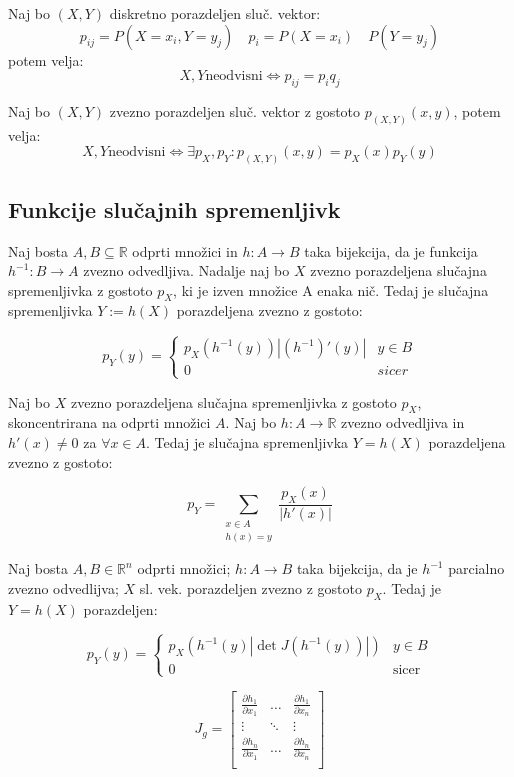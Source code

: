 \begin{multicols}{5}
Naj bo $(X, Y)$ diskretno porazdeljen sluč. vektor:
\[ p_{ij} = P(X = x_i, Y = y_j) \quad p_i = P(X = x_i) \quad P(Y = y_j) \]
potem velja:
\[ X, Y \text{neodvisni} \iff p_{ij} = p_i q_j \]


Naj bo $(X, Y)$ zvezno porazdeljen sluč. vektor z gostoto $ p_{(X, Y)}(x,y)$, potem velja:
\[ X, Y \text{neodvisni} \iff \exists p_X, p_Y: p_{(X,Y)}(x,y) = p_X(x) p_Y(y)\]

\subsection{Funkcije slučajnih spremenljivk}
Naj bosta $A, B \subseteq \mathbb{R}$ odprti množici in $h: A \to B$ taka bijekcija, da je funkcija
$h^{-1}: B \to A$ zvezno odvedljiva. Nadalje naj bo $X$ zvezno porazdeljena slučajna
spremenljivka z gostoto $p_X$, ki je izven množice A enaka nič. Tedaj je slučajna
spremenljivka $Y := h(X)$ porazdeljena zvezno z gostoto:

\[ p_Y(y) = \begin{cases}
	p_X\left( h^{-1}(y) \right) \left|(h^{-1})'(y)\right| & y \in B \\
	0 & sicer	
\end{cases}\]

Naj bo $X$ zvezno porazdeljena slučajna spremenljivka z gostoto $p_X$, skoncentrirana na odprti množici $A$. Naj bo $h: A \to \mathbb{R}$ zvezno odvedljiva in $h'(x) \neq 0$ za $\forall x \in A$. 
Tedaj je slučajna spremenljivka $Y = h(X)$ porazdeljena zvezno z gostoto:

\[ p_Y = \sum_{\substack{x \in A \\ h(x) = y}} \frac{p_X(x)}{|h'(x)|}\]

Naj bosta $A, B \in \mathbb{R}^n$ odprti množici; $h: A \to B$ taka bijekcija, da je $h^{-1}$ parcialno zvezno odvedlijva; $X$ sl. vek. porazdeljen zvezno z gostoto $p_X$.
Tedaj je $Y = h(X)$ porazdeljen:

\[ p_Y(y) = \begin{cases}
	p_X(h^{-1}(y) |\det J(h^{-1}(y))|) & y \in B \\
	0 & \text{sicer}
\end{cases}\]

\[
    J_g = \begin{bmatrix}
        \frac{\partial h_1}{\partial x_1} & \dots & \frac{\partial h_1}{\partial x_n} \\
        \vdots & \ddots & \vdots \\
        \frac{\partial h_n}{\partial x_1} & \dots & \frac{\partial h_n}{\partial x_n} \\
    \end{bmatrix}
\]



\end{multicols}
